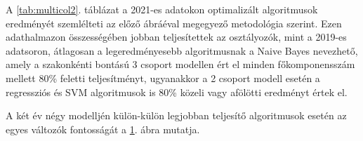 \documentclass[12pt]{article}
\begin{document}
A \ref{tab:multicol2}. táblázat a 2021-es adatokon optimalizált algoritmusok eredményét szemlélteti az előző ábráéval megegyező metodológia szerint. Ezen adathalmazon összességében jobban teljesítettek az osztályozók, mint a 2019-es adatsoron, átlagosan a legeredményesebb algoritmusnak a Naive Bayes nevezhető, amely a szakonkénti bontású 3 csoport modellen ért el minden főkomponensszám mellett 80\% feletti teljesítményt, ugyanakkor a 2 csoport modell esetén a regressziós és SVM algoritmusok is 80\% közeli vagy afölötti eredményt értek el. 

A két év négy modelljén külön-külön legjobban teljesítő algoritmusok esetén az egyes változók fontosságát a \ref{fig:variables}. ábra mutatja.

\begin{figure}

\label{fig:variables}
\end{figure}

%	




\begin{thebibliography}{9}
\end{thebibliography}
\end{document}
